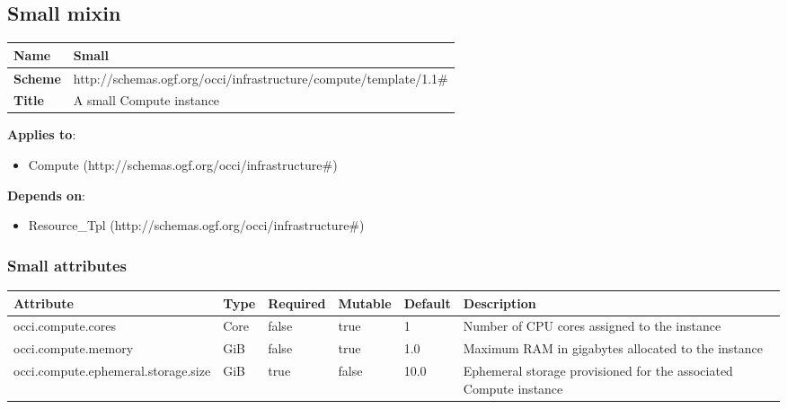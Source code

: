 \documentclass{article}
\begin{document}
\subsection{Small mixin}
\begin{center}
\begin{tabular}{|l|l|}
  \hline
  \textbf{Name} & Small \\
  \hline  
  \textbf{Scheme} & http://schemas.ogf.org/occi/infrastructure/compute/template/1.1\# \\
  \hline
  \textbf{Title} & A small Compute instance \\
  \hline
\end{tabular}
\end{center}
\textbf{Applies to}:
\begin{itemize}
	\item Compute (http://schemas.ogf.org/occi/infrastructure\#)
\end{itemize}
\textbf{Depends on}:
\begin{itemize}
	\item Resource\_Tpl (http://schemas.ogf.org/occi/infrastructure\#)
\end{itemize}

\subsubsection{Small attributes}
\begin{tabularx}{\textwidth}{|l|l|p{1.4cm}|p{1.3cm}|l|X|}
  \hline
  \textbf{Attribute} & \textbf{Type} & \textbf{Required} & \textbf{Mutable} & \textbf{Default} & \textbf{Description} \\
  \hline  
  occi.compute.cores & Core & false & true & 1 & Number of CPU cores assigned to the instance \\
  \hline
  occi.compute.memory & GiB & false & true & 1.0 & Maximum RAM in gigabytes allocated to the instance \\
  \hline
  occi.compute.ephemeral.storage.size & GiB & true & false & 10.0 & Ephemeral storage provisioned for the associated Compute instance \\
  \hline
\end{tabularx}
\end{document}
